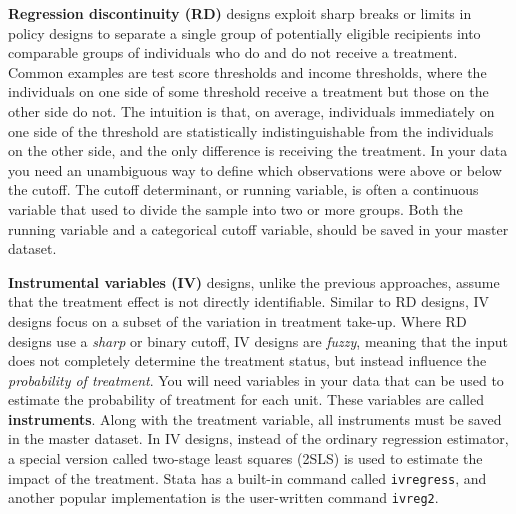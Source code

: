 \textbf{Regression discontinuity (RD)}
designs exploit sharp breaks or limits
in policy designs to separate a single group of potentially eligible recipients
into comparable groups of individuals who do and do not receive a treatment.
Common examples are test score thresholds and income thresholds,
where the individuals on one side of some threshold receive
a treatment but those on the other side do not.
The intuition is that, on average,
individuals immediately on one side of the threshold
are statistically indistinguishable from the individuals on the other side,
and the only difference is receiving the treatment.
In your data you need an unambiguous way
to define which observations were above or below the cutoff.
The cutoff determinant, or running variable,
is often a continuous variable 
that used to divide the sample into two or more groups. 
Both the running variable and a categorical cutoff variable,
should be saved in your master dataset.


\textbf{Instrumental variables (IV)}
designs, unlike the previous approaches,
assume that the treatment effect is not directly identifiable.
Similar to RD designs,
IV designs focus on a subset of the variation in treatment take-up.
Where RD designs use a \textit{sharp} or binary cutoff,
IV designs are \textit{fuzzy}, meaning that the input does not completely determine
the treatment status, but instead influence the \textit{probability of treatment}.
You will need variables in your data
that can be used to estimate the probability of treatment for each unit.
These variables are called \textbf{instruments}.
Along with the treatment variable, 
all instruments must be saved in the master dataset.
In IV designs, instead of the ordinary regression estimator,
a special version called two-stage least squares (2SLS) is used
to estimate the impact of the treatment.
Stata has a built-in command called \texttt{ivregress},
and another popular implementation is the user-written command \texttt{ivreg2}.



